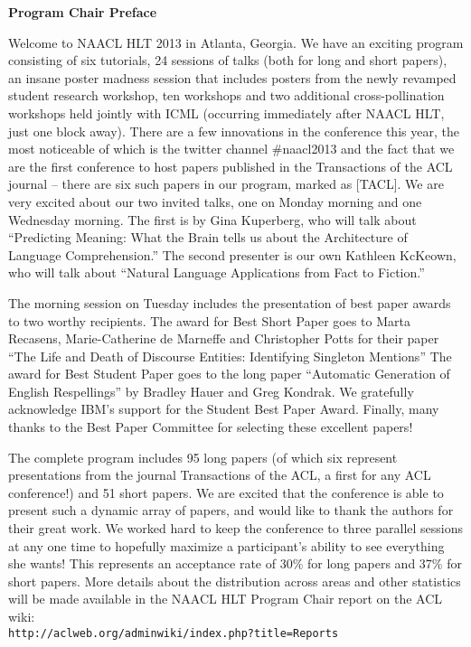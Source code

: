 \documentclass[11pt]{article}
\begin{document}
\begin{center}
  {\Large \bf Program Chair Preface} 
\end{center}

\vspace*{0.5cm}


Welcome to NAACL HLT 2013 in Atlanta, Georgia. We have an exciting program consisting of six tutorials, 24 sessions of talks (both for long and short papers), an insane poster madness session that includes posters from the newly revamped student research workshop, ten workshops and two additional cross-pollination workshops held jointly with ICML (occurring immediately after NAACL HLT, just one block away). There are a few innovations in the conference this year, the most noticeable of which is the twitter channel \#naacl2013 and the fact that we are the first conference to host papers published in the Transactions of the ACL journal -- there are six such papers in our program, marked as [TACL].
We are very excited about our two invited talks, one on Monday morning and one Wednesday morning. The first is by Gina Kuperberg, who will talk about ``Predicting Meaning: What the Brain tells us about the Architecture of Language Comprehension.'' The second presenter is our own Kathleen KcKeown, who will talk about ``Natural Language Applications from Fact to Fiction.''

The morning session on Tuesday includes the presentation of best paper awards to two worthy recipients. The award for Best Short Paper goes to Marta Recasens, Marie-Catherine de Marneffe and Christopher Potts for their paper ``The Life and Death of Discourse Entities: Identifying Singleton Mentions'' The award for Best Student Paper goes to the long paper ``Automatic Generation of English Respellings'' by Bradley Hauer and Greg Kondrak. We gratefully acknowledge IBM’s support for the Student Best Paper Award. Finally, many thanks to the Best Paper Committee for selecting these excellent papers!

The complete program includes 95 long papers (of which six represent presentations from the journal Transactions of the ACL, a first for any ACL conference!) and 51 short papers. We are excited that the conference is able to present such a dynamic array of papers, and would like to thank the authors for their great work. We worked hard to keep the conference to three parallel sessions at any one time to hopefully maximize a participant's ability to see everything she wants! This represents an acceptance rate of 30\% for long papers and 37\% for short papers. More details about the distribution across areas and other statistics will be made available in the NAACL HLT Program Chair report on the ACL wiki: \\\texttt{http://aclweb.org/adminwiki/index.php?title=Reports}
\end{document}
